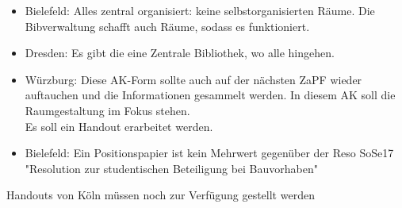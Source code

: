     \begin{itemize}
      \item Bielefeld: Alles zentral organisiert: keine selbstorganisierten Räume. Die Bibverwaltung schafft auch Räume, sodass es funktioniert.

      \item Dresden: Es gibt die eine Zentrale Bibliothek, wo alle hingehen.

      \item Würzburg: Diese AK-Form sollte auch auf der nächsten ZaPF wieder auftauchen und die Informationen gesammelt werden.
      In diesem AK soll die Raumgestaltung im Fokus stehen. \\

      Es soll ein Handout erarbeitet werden.

      \item Bielefeld: Ein Positionspapier ist kein Mehrwert gegenüber der Reso SoSe17 "Resolution zur studentischen Beteiligung bei Bauvorhaben"

    \end{itemize}

   Handouts von Köln müssen noch zur Verfügung gestellt werden
                                                                                                                              